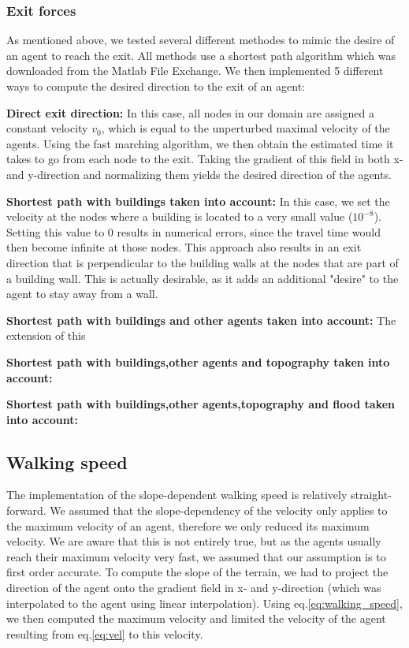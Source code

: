 \documentclass[11pt]{article}
\begin{document}
\subsubsection{Exit forces}
As mentioned above, we tested several different methodes to mimic the desire of an agent to reach the exit. All methods use a shortest path algorithm which was downloaded from the Matlab File Exchange. We then implemented 5 different ways to compute the desired direction to the exit of an agent:
\begin{description}
\item{\textbf{Direct exit direction: }}In this case, all nodes in our domain are assigned a constant velocity $v_0$, which is equal to the unperturbed maximal velocity of the agents. Using the fast marching algorithm, we then obtain the estimated time it takes to go from each node to the exit. Taking the gradient of this field in both x- and y-direction and normalizing them yields the desired direction of the agents.
\item{\textbf{Shortest path with buildings taken into account: }} In this case, we set the velocity at the nodes where a building is located to a very small value ($10^{-8}$). Setting this value to 0 results in numerical errors, since the travel time would then become infinite at those nodes. This approach also results in an exit direction that is perpendicular to the building walls at the nodes that are part of a building wall. This is actually desirable, as it adds an additional "desire" to the agent to stay away from a wall.
\item{\textbf{Shortest path with buildings and other agents taken into account: }} The extension of this
\item{\textbf{Shortest path with buildings,other agents and topography taken into account: }}
\item{\textbf{Shortest path with buildings,other agents,topography and flood taken into account: }}
\end{description}

\subsection{Walking speed}
The implementation of the slope-dependent walking speed is relatively straight-forward. We assumed that the slope-dependency of the velocity only applies to the maximum velocity of an agent, therefore we only reduced its maximum velocity. We are aware that this is not entirely true, but as the agents usually reach their maximum velocity very fast, we assumed that our assumption is to first order accurate. To compute the slope of the terrain, we had to project the direction of the agent onto the gradient field in x- and y-direction (which was interpolated to the agent using linear interpolation). Using eq.\eqref{eq:walking_speed}, we then computed the maximum velocity and limited the velocity of the agent resulting from eq.\eqref{eq:vel} to this velocity.
\end{document}
